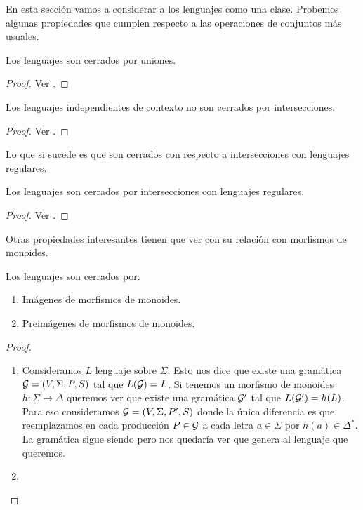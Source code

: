 \documentclass[tesis.tex]{subfiles}
\begin{document}
En esta sección vamos a considerar a los lenguajes \ic como una clase. 
Probemos algunas propiedades que cumplen respecto a las operaciones de conjuntos más usuales.

\begin{prop}
	Los lenguajes \ic son cerrados por uniones.
\end{prop}
\begin{proof}
	Ver \cite{hopcraft-ullman}.
\end{proof}

\begin{prop}
	Los lenguajes independientes de contexto no son cerrados por intersecciones.
\end{prop}

\begin{proof}
	Ver \cite{hopcraft-ullman}.
\end{proof}

Lo que si sucede es que son cerrados con respecto a intersecciones con lenguajes regulares.

\begin{prop}\label{intersecciones-reg-ic}
	Los lenguajes \ic son cerrados por intersecciones con lenguajes regulares.
\end{prop}

\begin{proof}
	Ver \cite{hopcraft-ullman}.
\end{proof}

Otras propiedades interesantes tienen que ver con su relación con morfismos de monoides. 

\begin{prop}\label{morfismos-monoides-ic}
	Los lenguajes \ic son cerrados por:
	\begin{enumerate}
		\item Imágenes de morfismos de monoides.
		\item Preimágenes de morfismos de monoides.
	\end{enumerate}
\end{prop}

\begin{proof}
	\begin{enumerate}
		\item Consideramos $L$ lenguaje \ic sobre $\Sigma$.
		Esto nos dice que existe una gramática ${\cal G} = (V, \Sigma, P, S) $ tal que $L({\cal G}) = L$.
		Si tenemos un morfismo de monoides $h: \Sigma \to \Delta$ queremos ver que existe una gramática ${\cal G}'$ tal que $L({\cal G}') = h(L)$.
		Para eso consideramos ${\cal G}  = (V, \Sigma, P', S)$ donde la única diferencia es que reemplazamos en cada producción $P \in {\cal G}$ a cada letra $a \in \Sigma$ por $h(a) \in \Delta^*$.
		La gramática sigue siendo \ic pero nos quedaría ver que genera al lenguaje que queremos.
		\item 
	\end{enumerate}
\end{proof}
\end{document}
